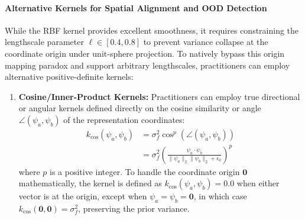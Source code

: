 \paragraph{Alternative Kernels for Spatial Alignment and OOD Detection}
While the RBF kernel provides excellent smoothness, it requires constraining the lengthscale parameter $\ell \in [0.4, 0.8]$ to prevent variance collapse at the coordinate origin under unit-sphere projection. To natively bypass this origin mapping paradox and support arbitrary lengthscales, practitioners can employ alternative positive-definite kernels:
\begin{enumerate}
    \item \textbf{Cosine/Inner-Product Kernels:} Practitioners can employ true directional or angular kernels defined directly on the cosine similarity or angle $\angle(\psi_a, \psi_b)$ of the representation coordinates:
    \begin{equation}
    \begin{aligned}
    k_{\text{cos}}(\psi_a, \psi_b) &= \sigma_f^2 \cos^p(\angle(\psi_a, \psi_b)) \\
    &= \sigma_f^2 \left( \frac{\psi_a \cdot \psi_b}{\|\psi_a\|_2 \|\psi_b\|_2 + \epsilon_0} \right)^p
    \end{aligned}
    \end{equation}
    where $p$ is a positive integer. To handle the coordinate origin $\mathbf{0}$ mathematically, the kernel is defined as $k_{\text{cos}}(\psi_a, \psi_b) = 0.0$ when either vector is at the origin, except when $\psi_a = \psi_b = \mathbf{0}$, in which case $k_{\text{cos}}(\mathbf{0}, \mathbf{0}) = \sigma_f^2$, preserving the prior variance.


\end{enumerate}
